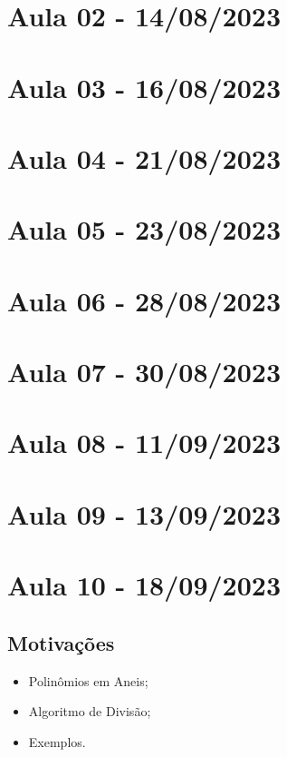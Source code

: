\documentclass{article}
\begin{document}
\section{Aula 02 - 14/08/2023}
\newpage

\section{Aula 03 - 16/08/2023}
\newpage

\section{Aula 04 - 21/08/2023}
\newpage

\section{Aula 05 - 23/08/2023}
\newpage

\section{Aula 06 - 28/08/2023}
\newpage

\section{Aula 07 - 30/08/2023}
\newpage

\section{Aula 08 - 11/09/2023}
\newpage

\section{Aula 09 - 13/09/2023}
\newpage

\section{Aula 10 - 18/09/2023}
\subsection{Motivações}
\begin{itemize}
\item Polinômios em Aneis;
\item Algoritmo de Divisão;
\item Exemplos.
\end{itemize}
\end{document}
